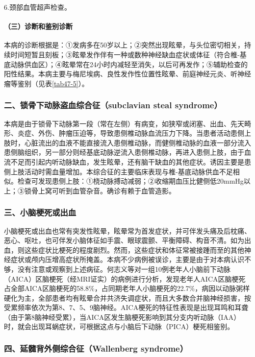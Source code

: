 6.颈部血管超声检查。

\paragraph{（三）诊断和鉴别诊断}

本病的诊断根据是：①发病多在50岁以上；②突然出现眩晕，与头位密切相关，持续时间短暂且刻板；③眩晕发作伴有一种或数种神经缺血症状或体征（符合椎-基底动脉供血区）；④眩晕常在24小时内减轻至消失，以后可再发作；⑤辅助检查的阳性结果。本病主要与梅尼埃病、良性发作性位置性眩晕、前庭神经元炎、听神经瘤等鉴别（见表\ref{tab47-5}）。

\subsubsection{二、锁骨下动脉盗血综合征（subclavian steal syndrome）}

本病是由于锁骨下动脉第一段（常在左侧）有病变，如狭窄或闭塞、出血、先天畸形、炎症、外伤、肿瘤压迫等，导致患侧椎动脉血流压力下降。当患者活动患侧上肢时，心脏流出的血液不能直接流入患侧椎动脉，而健侧椎动脉的血液一部分流入患侧脑组织，另一部分则经基底动脉逆流入患侧椎动脉，再进入患侧上肢，由于血流不足而引起内听动脉缺血，发生眩晕，还有脑干缺血的其他症状。诱因主要是患侧上肢活动时需血量增加。本综合征的主要临床表现与椎-基底动脉供血不足相似。检查可发现患侧上肢：①桡动脉搏动减弱；②收缩期血压比健侧低20mmHg以上；③锁骨上窝可听到血管杂音。确诊有赖于血管造影。

\subsubsection{三、小脑梗死或出血}

小脑梗死或出血也常有突发性眩晕，眩晕常为首发症状，并可伴发头痛及后枕痛、恶心、呕吐，也可伴发小脑体征如手震、眼球震颤、平衡障碍、构音不清。如为出血，则这些症状比梗死的程度剧烈。然而，这些症状和体征常被接踵而至的其他神经症状或颅内压增高症状所掩盖。本病不少病例被误诊，主要是由于对本病认识不够，没有注意或观察到上述病征。何志义等对一组10例老年人小脑前下动脉（AICA）区脑梗死（经MRI证实）的病例进行分析，发现老年人AICA区脑梗死占全部AICA区脑梗死的58.8\%，占同期老年人小脑梗死的22.7\%，病因以动脉粥样硬化为主，全部患者均有眩晕合并共济失调症状，而且大多数合并脑神经损害，按受累频率依次为第8、7、5、9脑神经。AICA梗死的特征性表现是出现耳鸣和耳聋（由于第8脑神经受累），当AICA区发生脑梗死影响到其分支内听动脉（IAA）时，就会出现耳蜗症状，可根据这点与小脑后下动脉（PICA）梗死相鉴别。

\subsubsection{四、延髓背外侧综合征（Wallenberg syndrome）}

